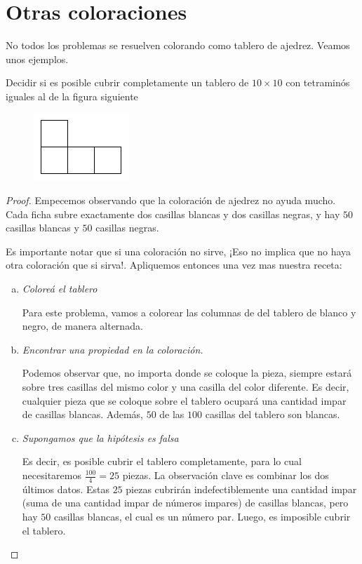 \section{Otras coloraciones}

No todos los problemas se resuelven colorando como tablero de ajedrez. Veamos unos ejemplos.

\begin{ejem}
	Decidir si es posible cubrir completamente un tablero de $10 \times 10 $ con tetramin\'os iguales al de la figura siguiente
	\begin{figure}[h!]
		\centering
		\includegraphics[scale=.8]{imgs/color4.png}
	\end{figure}
\end{ejem}

\begin{proof}
	Empecemos observando que la coloraci\'on de ajedrez no ayuda mucho. Cada ficha subre exactamente dos casillas blancas y dos casillas negras, y hay $50$ casillas blancas y $50$ casillas negras.
	
	Es importante notar que si una coloraci\'on no sirve, ¡Eso no implica que no haya otra coloraci\'on que si sirva!. Apliquemos entonces una vez mas nuestra receta:
	
	\begin{enumerate}[a.]
		
		\item \textit{Colore\'a el tablero}
		
		Para este problema, vamos a colorear las columnas de del tablero de blanco y negro, de manera alternada.
		
		\item \textit{Encontrar una propiedad en la coloraci\'on.}
		
		Podemos observar que, no importa donde se coloque la pieza, siempre estar\'a sobre tres casillas del mismo color y una casilla del color diferente. Es decir, cualquier pieza que se coloque sobre el tablero ocupar\'a una cantidad impar de casillas blancas. Adem\'as, $50$ de las $100$ casillas del tablero son blancas.
		
		\item \textit{Supongamos que la hip\'otesis es falsa}
		
		Es decir, es posible cubrir el tablero completamente, para lo cual necesitaremos $\frac{100}{4} = 25$ piezas. La observaci\'on clave es combinar los dos \'ultimos datos. Estas $25$ piezas cubrir\'an indefectiblemente una cantidad impar (suma de una cantidad impar de n\'umeros impares) de casillas blancas, pero hay $50$ casillas blancas, el cual es un n\'umero par. Luego, es imposible cubrir el tablero.
	\end{enumerate}
\end{proof}

